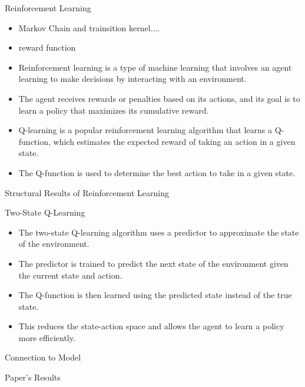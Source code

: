\documentclass[14pt]{beamer}
\begin{document}
\begin{frame}{Reinforcement Learning}
\begin{itemize}
    \item Markov Chain and trainsition kernel....
    \item reward function
    \item Reinforcement learning is a type of machine learning that involves an agent learning to make decisions by interacting with an environment.
    \item The agent receives rewards or penalties based on its actions, and its goal is to learn a policy that maximizes its cumulative reward.
    \item Q-learning is a popular reinforcement learning algorithm that learns a Q-function, which estimates the expected reward of taking an action in a given state.
    \item The Q-function is used to determine the best action to take in a given state.
\end{itemize}
\end{frame}
\begin{frame}{Structural Results of Reinforcement Learning}
\end{frame}
\begin{frame}{Two-State Q-Learning}
\begin{itemize}
    \item The two-state Q-learning algorithm uses a predictor to approximate the state of the environment.
    \item The predictor is trained to predict the next state of the environment given the current state and action.
    \item The Q-function is then learned using the predicted state instead of the true state.
    \item This reduces the state-action space and allows the agent to learn a policy more efficiently.
\end{itemize}
\end{frame}
\begin{frame}{Connection to Model}
\end{frame}
\begin{frame}{Paper's Results}
\end{frame}
\end{document}
